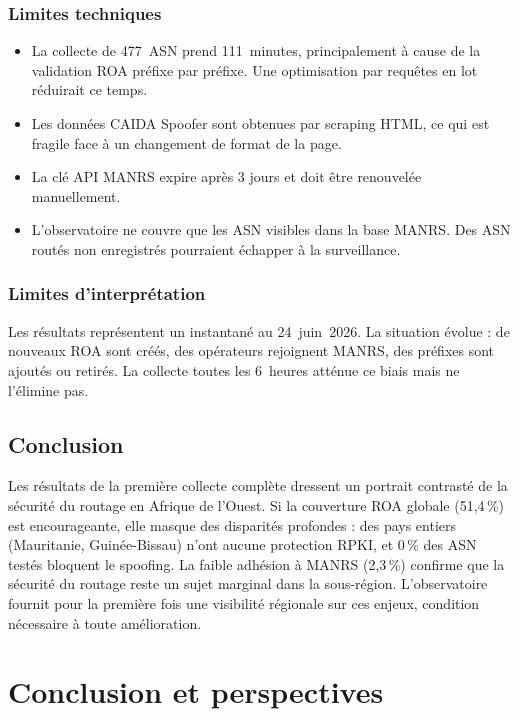 \documentclass{eneam}
\begin{document}
\subsection{Limites techniques}

\begin{itemize}
    \item La collecte de 477~ASN prend 111~minutes, principalement à cause de la validation ROA préfixe par préfixe. Une optimisation par requêtes en lot réduirait ce temps.
    \item Les données CAIDA Spoofer sont obtenues par scraping HTML, ce qui est fragile face à un changement de format de la page.
    \item La clé API MANRS expire après 3 jours et doit être renouvelée manuellement.
    \item L'observatoire ne couvre que les ASN visibles dans la base MANRS. Des ASN routés non enregistrés pourraient échapper à la surveillance.
\end{itemize}

\subsection{Limites d'interprétation}

Les résultats représentent un instantané au 24~juin~2026. La situation évolue : de nouveaux ROA sont créés, des opérateurs rejoignent MANRS, des préfixes sont ajoutés ou retirés. La collecte toutes les 6~heures atténue ce biais mais ne l'élimine pas.


\section{Conclusion}

Les résultats de la première collecte complète dressent un portrait contrasté de la sécurité du routage en Afrique de l'Ouest. Si la couverture ROA globale (51,4\,\%) est encourageante, elle masque des disparités profondes : des pays entiers (Mauritanie, Guinée-Bissau) n'ont aucune protection RPKI, et 0\,\% des ASN testés bloquent le spoofing. La faible adhésion à MANRS (2,3\,\%) confirme que la sécurité du routage reste un sujet marginal dans la sous-région. L'observatoire fournit pour la première fois une visibilité régionale sur ces enjeux, condition nécessaire à toute amélioration.


\chapter*{Conclusion et perspectives}
\setcounter{section}{0}
\end{document}
